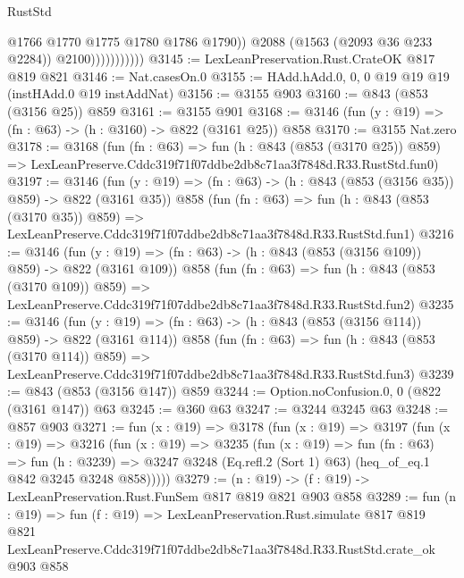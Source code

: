 \begin{lexlean}{RustStd}
\begin{coremodule}
                              @1766
                              @1770
                              @1775
                              @1780
                              @1786
                              @1790))
                          @2088
                          (@1563 (@2093 @36 @233 @2284))
                          @2100)))))))))))
@3145 := LexLeanPreservation.Rust.CrateOK @817 @819 @821
@3146 := Nat.casesOn.{0}
@3155 := HAdd.hAdd.{0, 0, 0} @19 @19 @19 (instHAdd.{0} @19 instAddNat)
@3156 := @3155 @903
@3160 := @843 (@853 (@3156 @25)) @859
@3161 := @3155 @901
@3168 := @3146 (fun (y : @19) => (fn : @63) -> (h : @3160) -> @822 (@3161 @25)) @858
@3170 := @3155 Nat.zero
@3178 := @3168
    (fun (fn : @63) =>
    fun (h : @843 (@853 (@3170 @25)) @859) =>
    LexLeanPreserve.Cddc319f71f07ddbe2db8c71aa3f7848d.R33.RustStd.fun0)
@3197 := @3146
    (fun (y : @19) => (fn : @63) -> (h : @843 (@853 (@3156 @35)) @859) -> @822 (@3161 @35))
    @858
    (fun (fn : @63) =>
    fun (h : @843 (@853 (@3170 @35)) @859) =>
    LexLeanPreserve.Cddc319f71f07ddbe2db8c71aa3f7848d.R33.RustStd.fun1)
@3216 := @3146
    (fun (y : @19) => (fn : @63) -> (h : @843 (@853 (@3156 @109)) @859) -> @822 (@3161 @109))
    @858
    (fun (fn : @63) =>
    fun (h : @843 (@853 (@3170 @109)) @859) =>
    LexLeanPreserve.Cddc319f71f07ddbe2db8c71aa3f7848d.R33.RustStd.fun2)
@3235 := @3146
    (fun (y : @19) => (fn : @63) -> (h : @843 (@853 (@3156 @114)) @859) -> @822 (@3161 @114))
    @858
    (fun (fn : @63) =>
    fun (h : @843 (@853 (@3170 @114)) @859) =>
    LexLeanPreserve.Cddc319f71f07ddbe2db8c71aa3f7848d.R33.RustStd.fun3)
@3239 := @843 (@853 (@3156 @147)) @859
@3244 := Option.noConfusion.{0, 0} (@822 (@3161 @147)) @63
@3245 := @360 @63
@3247 := @3244 @3245 @63
@3248 := @857 @903
@3271 := fun (x : @19) =>
  @3178
    (fun (x : @19) =>
    @3197
      (fun (x : @19) =>
      @3216
        (fun (x : @19) =>
        @3235
          (fun (x : @19) =>
          fun (fn : @63) =>
          fun (h : @3239) =>
          @3247 @3248 (Eq.refl.{2} (Sort 1) @63) (heq_of_eq.{1} @842 @3245 @3248 @858)))))
@3279 := (n : @19) -> (f : @19) -> LexLeanPreservation.Rust.FunSem @817 @819 @821 @903 @858
@3289 := fun (n : @19) =>
  fun (f : @19) =>
  LexLeanPreservation.Rust.simulate
    @817
    @819
    @821
    LexLeanPreserve.Cddc319f71f07ddbe2db8c71aa3f7848d.R33.RustStd.crate_ok
    @903
    @858
\end{coremodule}
\end{lexlean}
